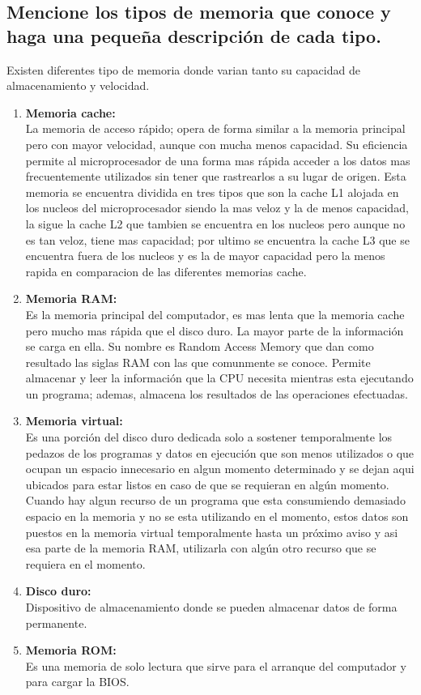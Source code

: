 \documentclass{article}
\begin{document}
\subsection{\textbf{Mencione los tipos de memoria que conoce y haga una pequeña descripción de cada tipo.}}
Existen diferentes tipo de memoria donde varian tanto su capacidad de almacenamiento y velocidad.\\
\begin{enumerate}
    \item \textbf{Memoria cache:} \\
    La memoria de acceso rápido; opera de forma similar a la memoria principal pero con mayor velocidad, aunque con mucha menos capacidad. Su eficiencia permite al microprocesador de una forma mas rápida acceder a los datos mas frecuentemente utilizados sin tener que rastrearlos a su lugar de origen. \cite{concepto} Esta memoria se encuentra dividida en tres tipos que son la cache L1 alojada en los nucleos del microprocesador siendo la mas veloz y la de menos capacidad, la sigue la cache L2 que tambien se encuentra en los nucleos pero aunque no es tan veloz, tiene mas capacidad; por ultimo se encuentra la cache L3 que se encuentra fuera de los nucleos y es la de mayor capacidad pero la menos rapida en comparacion de las diferentes memorias cache. \cite{augusto}
    \item \textbf{Memoria RAM:}\\
    Es la memoria principal del computador, es mas lenta que la memoria cache pero mucho mas rápida que el disco duro. La mayor parte de la información se carga en ella. Su nombre es Random Access Memory que dan como resultado las siglas RAM con las que comunmente se conoce. \cite{augusto}
    Permite almacenar y leer la información que la CPU necesita mientras esta ejecutando un programa; ademas, almacena los resultados de las operaciones efectuadas. \cite{ecured}
    \item \textbf{Memoria virtual:}\\
    Es una porción del disco duro dedicada solo a sostener temporalmente los pedazos de los programas y datos en ejecución que son menos utilizados o que ocupan un espacio innecesario en algun momento determinado y se dejan aqui ubicados para estar listos en caso de que se requieran en algún momento. Cuando hay algun recurso de un programa que esta consumiendo demasiado espacio en la memoria y no se esta utilizando en el momento, estos datos son puestos en la memoria virtual temporalmente hasta un próximo aviso y asi esa parte de la memoria RAM, utilizarla con algún otro recurso que se requiera en el momento.
    \item \textbf{Disco duro:}\\
    Dispositivo de almacenamiento donde se pueden almacenar datos de forma permanente. 
    \item \textbf{Memoria ROM:}\\
    Es una memoria de solo lectura que sirve para el arranque del computador y para cargar la BIOS.
   
\end{enumerate}
    
\end{document}
